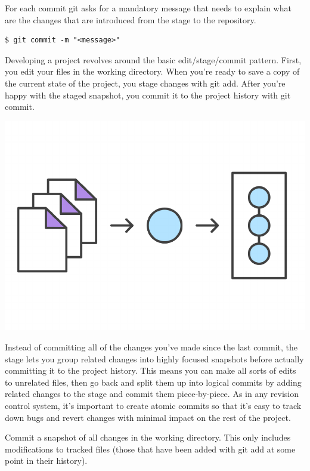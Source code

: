 \documentclass{article}
\begin{document}
For each commit git asks for a mandatory message that needs to explain
what are the changes that are introduced from the stage to the repository. 

\begin{lstlisting}
$ git commit -m "<message>"
\end{lstlisting}

Developing a project revolves around the basic edit/stage/commit
pattern. First, you edit your files in the working directory. When
you're ready to save a copy of the current state of the project, you
stage changes with git add. After you're happy with the staged
snapshot, you commit it to the project history with git commit. 

\begin{center}
\includegraphics[scale=0.5]{figures/04.pdf}
\end{center}

Instead of committing all of the changes you've made since the last
commit, the stage lets you group related changes into highly focused
snapshots before actually committing it to the project history. This
means you can make all sorts of edits to unrelated files, then go back
and split them up into logical commits by adding related changes to
the stage and commit them piece-by-piece. As in any revision control
system, it's important to create atomic commits so that it's easy to
track down bugs and revert changes with minimal impact on the rest of
the project. 

Commit a snapshot of all changes in the working directory. This only
includes modifications to tracked files (those that have been added
with git add at some point in their history).
\end{document}
